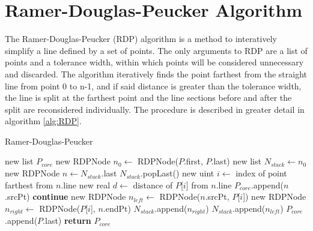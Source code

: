 \section{Ramer-Douglas-Peucker Algorithm}
The Ramer-Douglas-Peucker (RDP) algorithm is a method to interatively simplify a line defined by a set of points\cite{RDP_line_reduction_DP, RDP_line_reduction_R}.
The only arguments to RDP are a list of points and a tolerance width, within which points will be considered unnecessary and discarded.
The algorithm iteratively finds the point farthest from the straight line from point 0 to n-1, and if said distance is greater than the tolerance width, the line is split at the farthest point and the line sections before and after the split are reconsidered individually.
The procedure is described in greater detail in algorithm \ref{alg:RDP}.

\begin{algorithm}[H]
\caption{Ramer-Douglas-Peucker}\label{alg:RDP}
\begin{algorithmic}[1]
	\State new list $P_{core}$
	\State new RDPNode $n_0 \leftarrow$ RDPNode($P$.first, $P$.last)
	\State new list $N_{stack} \leftarrow n_0$
		\State new RDPNode $n \leftarrow N_{stack}$.last
		\State $N_{stack}$.popLast()
		\State new uint $i \leftarrow$ index of point farthest from $n$.line
		\State new real $d \leftarrow$ distance of $P$[$i$] from $n$.line
		 
			\State $P_{core}$.append($n$.srcPt) 
			\State \textbf{continue}
		\EndIf
		\State new RDPNode $n_{left} \leftarrow$ RDPNode($n$.srcPt, $P$[$i$])
		\State new RDPNode $n_{right} \leftarrow$ RDPNode($P$[$i$], $n$.endPt)
		\State $N_{stack}$.append($n_{right}$)
		\State $N_{stack}$.append($n_{left}$)
	\EndWhile
	\State $P_{core}$.append($P$.last)
	\State \textbf{return} $P_{core}$
\EndFunction
\end{algorithmic}
\end{algorithm}


